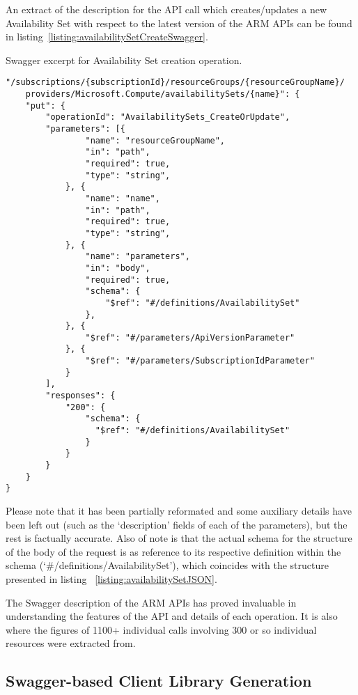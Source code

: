 \documentclass[11pt]{report}
\begin{document}
An extract of the description for the API call which creates/updates a new
Availability Set with respect to the latest version of the ARM APIs can be
found in listing~\ref{listing:availabilitySetCreateSwagger}.

\begin{listing}[H]
\caption{Swagger excerpt for Availability Set creation operation.}
\label{listing:availabilitySetCreateSwagger}
\begin{verbatim}
"/subscriptions/{subscriptionId}/resourceGroups/{resourceGroupName}/
    providers/Microsoft.Compute/availabilitySets/{name}": {
    "put": {
        "operationId": "AvailabilitySets_CreateOrUpdate",
        "parameters": [{
                "name": "resourceGroupName",
                "in": "path",
                "required": true,
                "type": "string",
            }, {
                "name": "name",
                "in": "path",
                "required": true,
                "type": "string",
            }, {
                "name": "parameters",
                "in": "body",
                "required": true,
                "schema": {
                    "$ref": "#/definitions/AvailabilitySet"
                },
            }, {
                "$ref": "#/parameters/ApiVersionParameter"
            }, {
                "$ref": "#/parameters/SubscriptionIdParameter"
            }
        ],
        "responses": {
            "200": {
                "schema": {
                  "$ref": "#/definitions/AvailabilitySet"
                }
            }
        }
    }
}
\end{verbatim}
\end{listing}
\newpage

Please note that it has been partially reformated and some auxiliary details
have been left out (such as the `description' fields of each of the
parameters), but the rest is factually accurate. Also of note is that the
actual schema for the structure of the body of the request is as reference to
its respective definition within the schema (`\#/definitions/AvailabilitySet'),
which coincides with the structure presented in listing
~\ref{listing:availabilitySetJSON}.


The Swagger description of the ARM APIs has proved invaluable in understanding
the features of the API and details of each operation. It is also where the
figures of 1100+ individual calls involving 300 or so individual resources were
extracted from.

\subsection{Swagger-based Client Library Generation}
\end{document}
